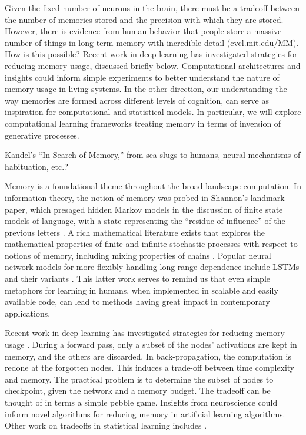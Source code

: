 \def\argmin{\mathop{arg\,min}}

\label{sec:aim4}

Given the fixed number of neurons in the brain, there must be a
tradeoff between the number of memories stored and the precision with
which they are stored. However, there is evidence from human behavior
that people store a massive number of things in long-term memory with
incredible detail
(\href{http://cvcl.mit.edu/MM/download.html}{cvcl.mit.edu/MM}). How is
this possible? Recent work in deep learning has investigated
strategies for reducing memory usage, discussed briefly below.
Computational
architectures and insights could inform simple experiments to better
understand the nature of memory usage in living systems.
In the other direction, our understanding the way memories are
formed across different levels of cognition, can serve as
inspiration for computational and statistical models. In particular,
we will explore computational learning frameworks treating memory
in terms of inversion of generative processes.

\biobackground{}
Kandel's ``In Search of Memory,'' from sea slugs to humans,
neural mechanisms of habituation, etc.?

\statbackground{} Memory is a foundational theme throughout the broad
landscape computation. In information theory, the notion of memory was
probed in Shannon's landmark paper, which presaged hidden Markov
models in the discussion of finite state models of language, with a
state representing the ``residue of influence'' of the previous
letters \citep{Shannon:48}. A rich mathematical literature exists that
explores the mathematical properties of finite and infinite stochastic
processes with respect to notions of memory, including mixing
properties of chains \citep{pollard84}. Popular neural network models
for more flexibly handling long-range dependence include LSTMs and
their variants \citep{sepp97,gers00}. This latter work serves to
remind us that even simple metaphors for learning in humans, when
implemented in scalable and easily available code, can lead to methods
having great impact in contemporary applications.

Recent work in deep learning has investigated
strategies for reducing memory usage \citep{ChenXZG16}. During a
forward pass, only a subset of the nodes' activations are kept in
memory, and the others are discarded. In back-propagation, the
computation is redone at the forgotten nodes. This induces a trade-off
between time complexity and memory. The practical problem is to
determine the subset of nodes to checkpoint, given the network and a
memory budget. The tradeoff can be thought of in terms a simple pebble
game. Insights from neuroscience could inform novel algorithms for
reducing memory in artificial learning algorithms. Other
work on tradeoffs in statistical learning includes
\citep{lucic15tradeoffs}.

